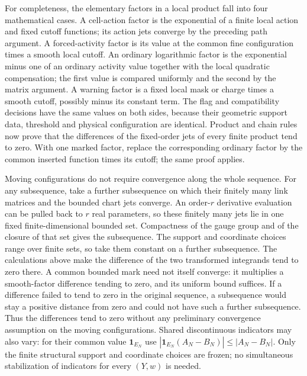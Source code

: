 For completeness, the elementary factors in a local product fall
into four mathematical cases. A cell-action factor is the
exponential of a finite local action and fixed cutoff functions;
its action jets converge by the preceding path argument. A
forced-activity factor is its value at the common fine configuration
times a smooth local cutoff. An ordinary logarithmic factor is
the exponential minus one of an ordinary activity value together
with the local quadratic compensation; the first value is
compared uniformly and the second by the matrix argument. A
warning factor is a fixed local mask or charge times a smooth
cutoff, possibly minus its constant term. The flag and compatibility
decisions have the same values on both sides, because their
geometric support data, threshold and physical configuration
are identical. Product and chain rules now prove that the differences
of the fixed-order jets of every finite product tend to zero.
With one marked factor, replace the corresponding ordinary
factor by the common inserted function times its cutoff; the
same proof applies.

Moving configurations do not require convergence along the
whole sequence. For any subsequence, take a further subsequence
on which their finitely many link matrices and the bounded
chart jets converge. An order-$r$ derivative evaluation can be
pulled back to $r$ real parameters, so these finitely many jets
lie in one fixed finite-dimensional bounded set. Compactness of
the gauge group and of the closure of that set gives the subsequence. The support and
coordinate choices range over finite sets, so take them constant
on a further subsequence. The calculations above make the difference of the two
transformed integrands tend to zero there. A common bounded
mark need not itself converge: it multiplies a smooth-factor
difference tending to zero, and its uniform bound suffices. If a difference
failed to tend to zero in the original sequence, a subsequence
would stay a positive distance from zero and could not have
such a further subsequence. Thus the differences tend to zero
without any preliminary convergence assumption on the moving
configurations. Shared discontinuous indicators may also vary: for their common
value $\mathbf1_{E_N}$ use
$|\mathbf1_{E_N}(A_N-B_N)|\le|A_N-B_N|$. Only the finite
structural support and coordinate choices are frozen; no
simultaneous stabilization of indicators for every $(Y,w)$ is needed.

